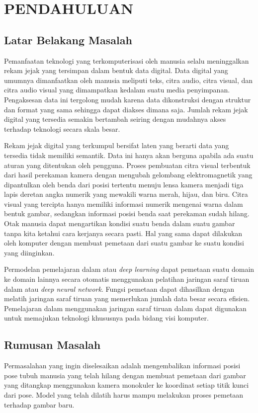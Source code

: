 
\chapter{PENDAHULUAN}
\label{cha:1-Pendahuluan}

\section{Latar Belakang Masalah}
\label{sec:1-LatarBelakangMasalah}

Pemanfaatan teknologi yang terkomputerisasi oleh manusia selalu meninggalkan rekam jejak yang
tersimpan dalam bentuk data digital. Data digital yang umumnya dimanfaatkan oleh manusia
meliputi teks, citra audio, citra visual, dan citra audio visual yang dimampatkan kedalam suatu
media penyimpanan. Pengaksesan data ini tergolong mudah karena data dikonstruksi dengan struktur
dan format yang sama sehingga dapat diakses dimana saja. Jumlah rekam jejak digital yang tersedia
semakin bertambah seiring dengan mudahnya akses terhadap teknologi secara skala besar.

Rekam jejak digital yang terkumpul bersifat laten yang berarti data yang tersedia tidak
memiliki semantik. Data ini hanya akan berguna apabila ada suatu aturan yang ditentukan
oleh pengguna. Proses pembuatan citra visual terbentuk dari hasil perekaman kamera dengan mengubah
gelombang elektromagnetik yang dipantulkan oleh benda dari posisi tertentu menuju lensa kamera
menjadi tiga lapis deretan angka numerik yang mewakili warna merah, hijau, dan biru. Citra visual
yang tercipta hanya memiliki informasi numerik mengenai warna dalam bentuk gambar, sedangkan
informasi posisi benda saat perekaman sudah hilang. Otak manusia dapat mengartikan kondisi suatu
benda dalam suatu gambar tanpa kita ketahui cara kerjanya secara pasti. Hal yang sama dapat
dilakukan oleh komputer dengan membuat pemetaan dari suatu gambar ke suatu kondisi yang diinginkan.

Permodelan pemelajaran dalam atau \textit{deep learning} dapat pemetaan suatu domain ke
domain lainnya secara otomatis menggunakan pelatihan jaringan saraf tiruan dalam atau
\textit{deep neural network}. Fungsi pemetaan dapat dihasilkan dengan melatih jaringan saraf tiruan
yang memerlukan jumlah data besar secara efisien. Pemelajaran dalam menggunakan jaringan
saraf tiruan dalam dapat digunakan untuk memajukan teknologi khususnya pada bidang visi komputer.

\section{Rumusan Masalah}
\label{sec:1-RumusanMasalah}
Permasalahan yang ingin diselesaikan adalah mengembalikan informasi posisi pose tubuh manusia yang
telah hilang dengan membuat pemetaan dari gambar yang ditangkap menggunakan kamera monokuler ke
koordinat setiap titik kunci dari pose. Model yang telah dilatih harus mampu melakukan proses
pemetaan terhadap gambar baru.

